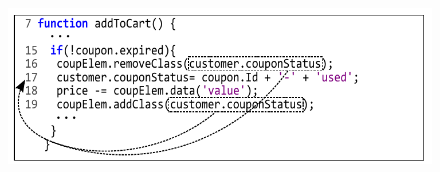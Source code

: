 \begin{figure}[!t]
  \centering
  \includegraphics[width=1\hsize]{fig/candidateDOMToCode}
  \vspace{-0.3in} 
  \label{Fig:candidateDOMToCode}
  \vspace{-0.2in} 
\end{figure}
